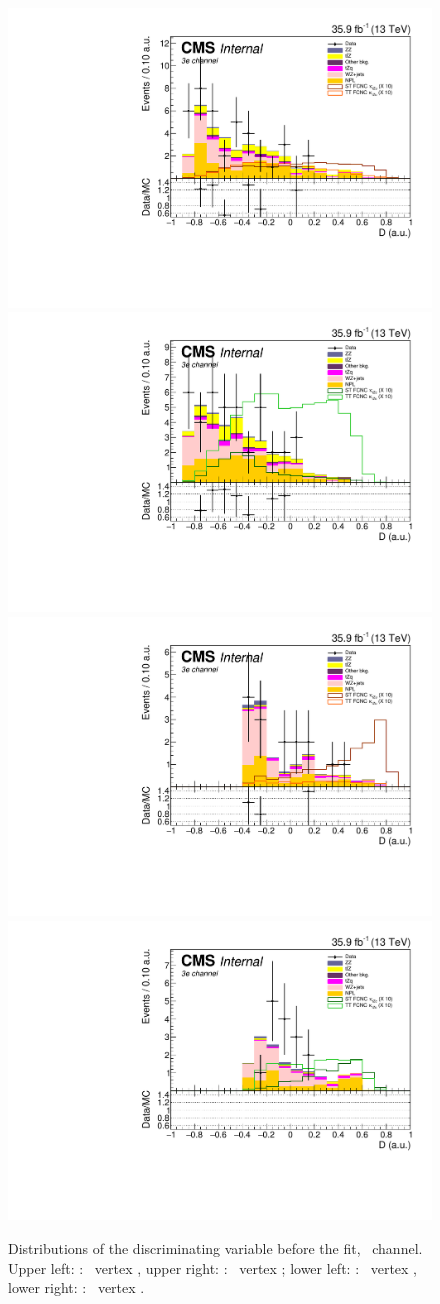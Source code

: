 \begin{figure}[ht]
	\centering
	\includegraphics[width=0.39\linewidth]{6_Search/Figures/BDTdistributions/toppair_Zut_BDT_eee_Stack}
	\includegraphics[width=0.39\linewidth]{6_Search/Figures/BDTdistributions/toppair_Zct_BDT_eee_Stack}
	\includegraphics[width=0.39\linewidth]{6_Search/Figures/BDTdistributions/singletop_Zut_BDT_eee_Stack}
	\includegraphics[width=0.39\linewidth]{6_Search/Figures/BDTdistributions/singletop_Zct_BDT_eee_Stack}
	\caption{Distributions of the discriminating variable before the fit, \eee\  channel. Upper left: \TTSR: \Zut\ vertex , upper right: \TTSR: \Zct\ vertex ; lower left: \STSR: \Zut\ vertex , lower right: \STSR: \Zct\ vertex .}
	\label{fig:bdteeestack}
\end{figure}
\clearpage
